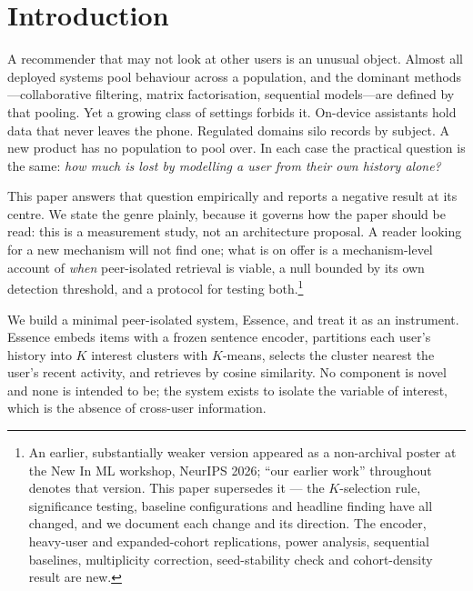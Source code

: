 \documentclass[runningheads]{llncs}
\begin{document}
\section{Introduction}

A recommender that may not look at other users is an unusual object. Almost all deployed
systems pool behaviour across a population, and the dominant methods---collaborative
filtering, matrix factorisation, sequential models---are defined by that pooling. Yet a
growing class of settings forbids it. On-device assistants hold data that never leaves the
phone. Regulated domains silo records by subject. A new product has no population to pool
over. In each case the practical question is the same: \emph{how much is lost by modelling
a user from their own history alone?}

This paper answers that question empirically and reports a negative result at its
centre. We state the genre plainly, because it governs how the paper should be read: this is a
measurement study, not an architecture proposal. A reader looking for a new mechanism will
not find one; what is on offer is a mechanism-level account of \emph{when} peer-isolated
retrieval is viable, a null bounded by its own detection threshold, and a protocol for
testing both.\footnote{An earlier, substantially weaker version appeared as a non-archival poster at the
New In ML workshop, NeurIPS 2026; ``our earlier work'' throughout denotes that version. This
paper supersedes it --- the $K$-selection rule, significance testing, baseline
configurations and headline finding have all changed, and we document each change and its
direction. The encoder, heavy-user and expanded-cohort replications, power analysis,
sequential baselines, multiplicity correction, seed-stability check and cohort-density
result are new.}

We build a minimal peer-isolated system, Essence, and treat it as an instrument. Essence
embeds items with a frozen sentence encoder, partitions each user's history into $K$
interest clusters with $K$-means, selects the cluster nearest the user's recent activity,
and retrieves by cosine similarity. No component is novel and none is intended to be; the
system exists to isolate the variable of interest, which is the absence of cross-user
information.
\end{document}
